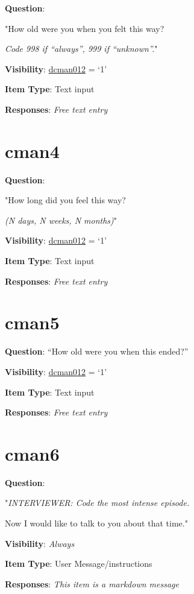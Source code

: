 \documentclass[]{book}
\begin{document}
\textbf{Question}:

"How old were you when you felt this way?

\emph{Code 998 if ``always'', 999 if ``unknown''.}"

\textbf{Visibility}: \protect\hyperlink{dcman012}{dcman012} = `1'

\textbf{Item Type}: Text input

\textbf{Responses}: \emph{Free text entry}

\hypertarget{cman4}{%
\section{cman4}\label{cman4}}

\textbf{Question}:

"How long did you feel this way?

\emph{(N days, N weeks, N months)}"

\textbf{Visibility}: \protect\hyperlink{dcman012}{dcman012} = `1'

\textbf{Item Type}: Text input

\textbf{Responses}: \emph{Free text entry}

\hypertarget{cman5}{%
\section{cman5}\label{cman5}}

\textbf{Question}: ``How old were you when this ended?''

\textbf{Visibility}: \protect\hyperlink{dcman012}{dcman012} = `1'

\textbf{Item Type}: Text input

\textbf{Responses}: \emph{Free text entry}

\hypertarget{cman6}{%
\section{cman6}\label{cman6}}

\textbf{Question}:

"\emph{INTERVIEWER: Code the most intense episode.}

Now I would like to talk to you about that time."

\textbf{Visibility}: \emph{Always}

\textbf{Item Type}: User Message/instructions

\textbf{Responses}: \emph{This item is a markdown message}
\end{document}
